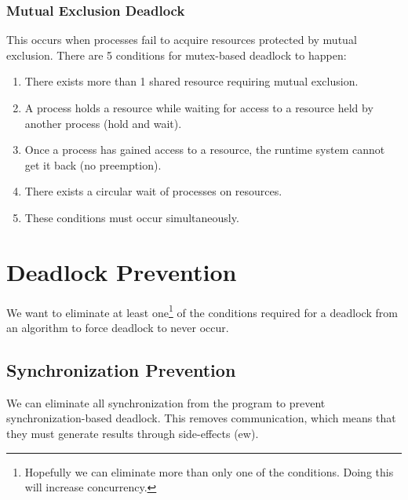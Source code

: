                 \subsubsection{Mutual Exclusion Deadlock} %
                \label{ssub:mutual_exclusion_deadlock}
                    This occurs when processes fail to acquire resources protected by mutual exclusion.
                    There are 5 conditions for mutex-based deadlock to happen:
                    \begin{enumerate}
                        \item There exists more than 1 shared resource requiring mutual exclusion.
                        \item A process holds a resource while waiting for access to a resource held by another process (hold and wait).
                        \item Once a process has gained access to a resource, the runtime system cannot get it back (no preemption).
                        \item There exists a circular wait of processes on resources.
                        \item These conditions must occur simultaneously.
                    \end{enumerate}
        \section{Deadlock Prevention} %
        \label{sec:deadlock_prevention}
            We want to eliminate at least one\footnote{Hopefully we can eliminate more than only one of the conditions. Doing this will increase concurrency.} of the conditions required for a deadlock from an algorithm to force deadlock to never occur.
            \subsection{Synchronization Prevention} %
            \label{sub:synchronization_prevention}
                We can eliminate all synchronization from the program to prevent synchronization-based deadlock.
                This removes communication, which means that they must generate results through side-effects (ew).
